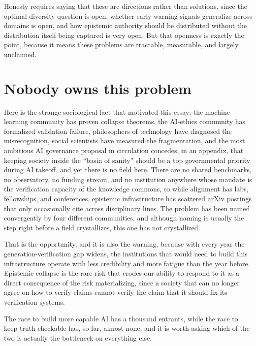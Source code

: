 \documentclass[11pt,letterpaper]{article}
\begin{document}
Honesty requires saying that these are directions rather than solutions, since the optimal-diversity question is open, whether early-warning signals generalize across domains is open, and how epistemic authority should be distributed without the distribution itself being captured is very open. But that openness is exactly the point, because it means these problems are tractable, measurable, and largely unclaimed.

\section{Nobody owns this problem}

Here is the strange sociological fact that motivated this essay: the machine learning community has proven collapse theorems, the AI-ethics community has formalized validation failure, philosophers of technology have diagnosed the misrecognition, social scientists have measured the fragmentation, and the most ambitious AI governance proposal in circulation concedes, in an appendix, that keeping society inside the ``basin of sanity'' should be a top governmental priority during AI takeoff, and yet there is no field here. There are no shared benchmarks, no observatory, no funding stream, and no institution anywhere whose mandate is the verification capacity of the knowledge commons, so while alignment has labs, fellowships, and conferences, epistemic infrastructure has scattered arXiv postings that only occasionally cite across disciplinary lines. The problem has been named convergently by four different communities, and although naming is usually the step right before a field crystallizes, this one has not crystallized.

That is the opportunity, and it is also the warning, because with every year the generation-verification gap widens, the institutions that would need to build this infrastructure operate with less credibility and more fatigue than the year before. Epistemic collapse is the rare risk that erodes our ability to respond to it as a direct consequence of the risk materializing, since a society that can no longer agree on how to verify claims cannot verify the claim that it should fix its verification systems.

The race to build more capable AI has a thousand entrants, while the race to keep truth checkable has, so far, almost none, and it is worth asking which of the two is actually the bottleneck on everything else.
\end{document}
